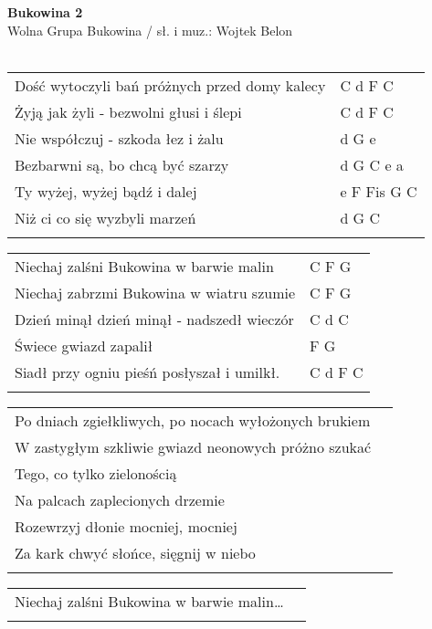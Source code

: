 \documentclass[a5paper]{article}
\begin{document}


\noindent
\fontsize{12pt}{15pt}\selectfont
\textbf{Bukowina 2} \\
\fontsize{8pt}{10pt}\selectfont
Wolna Grupa Bukowina / sł. i muz.: Wojtek Belon  \\ \\
\fontsize{10pt}{12pt}\selectfont
{}
\begin{tabular}{@{}p{8.5cm}p{3cm}@{}}
\noindent
Dość wytoczyli bań próżnych przed domy kalecy & C d F C \\
Żyją jak żyli - bezwolni głusi i ślepi & C d F C \\
Nie współczuj - szkoda łez i żalu & d G e \\
Bezbarwni są, bo chcą być szarzy & d G C e a \\
Ty wyżej, wyżej bądź i dalej & e F Fis G C \\
Niż ci co się wyzbyli marzeń & d G C \\ \\
\end{tabular}

\noindent
\begin{tabular}{@{}p{7.5cm}p{3cm}@{}}
Niechaj zalśni Bukowina w barwie malin & C F G \\
Niechaj zabrzmi Bukowina w wiatru szumie & C F G \\
Dzień minął dzień minął - nadszedł wieczór & C d C \\
Świece gwiazd zapalił & F G \\
Siadł przy ogniu pieśń posłyszał i umilkł. & C d  F C \\ \\
\end{tabular}

\noindent
\begin{tabular}{@{}p{8.5cm}p{3cm}@{}}
Po dniach zgiełkliwych, po nocach wyłożonych brukiem \\
W zastygłym szkliwie gwiazd neonowych próżno szukać \\
Tego, co tylko zielonością \\
Na palcach zaplecionych drzemie \\
Rozewrzyj dłonie mocniej, mocniej \\
Za kark chwyć słońce, sięgnij w niebo \\ \\
\end{tabular}

\noindent
\begin{tabular}{@{}p{8.5cm}p{3cm}@{}}
Niechaj zalśni Bukowina w barwie malin… \\ \\
\end{tabular}
\end{document}
